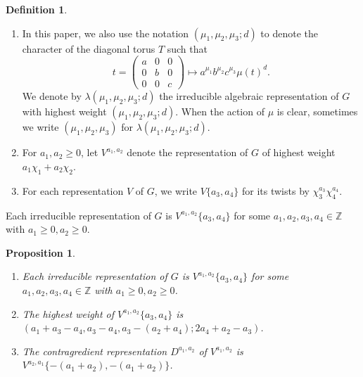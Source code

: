 \documentclass[11pt, a4paper]{amsart}
\theoremstyle{plain}
\newtheorem{proposition}[theorem]{Proposition}
\theoremstyle{definition}
\newtheorem{definition}[theorem]{Definition}
\numberwithin{equation}{section}
\begin{document}
\begin{definition}
\begin{enumerate}
\begin{align*}
\begin{pmatrix}
                                                                        0 & 0 & \frac{z\bar{z}}{\bar{x}}
                                                                  \end{pmatrix} \mapsto \frac{\overline{\det}}{\mu}.                                           
        \end{align*}
        Here, $x, \bar{x}, z, \bar{z}$ are $4$ independent variables. 
        \item In this paper, we also use the notation $(\mu_1, \mu_2, \mu_3; d)$ to denote the character of the diagonal torus $T$ such that 
              \begin{equation*}
                   t = \begin{pmatrix}
                         a & 0 & 0 \\
                         0 & b & 0 \\
                         0 & 0 & c 
                       \end{pmatrix} \mapsto a^{\mu_1} b^{\mu_2} c^{\mu_3} \mu(t)^{d}. 
              \end{equation*}
        We denote by $\lambda(\mu_1, \mu_2, \mu_3; d)$ the irreducible algebraic representation of $G$ with highest weight $(\mu_1, \mu_2, \mu_3; d)$. When the action of $\mu$ is clear, sometimes we write $(\mu_1, \mu_2, \mu_3)$ for $\lambda(\mu_1, \mu_2, \mu_3; d)$. 
        \item For $a_1, a_2 \ge 0$, let $V^{a_1, a_2}$ denote the representation of $G$ of highest weight $a_1\chi_1 + a_2\chi_2$.
        \item For each representation $V$ of $G$, we write $V\{a_3,a_4\}$ for its twists by $\chi_3^{a_3}\chi_4^{a_4}$.
    \end{enumerate}
\end{definition}
Each irreducible representation of $G$ is $V^{a_1,a_2}\{a_3,a_4\}$ for some $a_1, a_2, a_3, a_4 \in \mathbb{Z}$ with $a_1 \ge 0, a_2 \ge 0$. 

\begin{proposition}
    \begin{enumerate}
        \item Each irreducible representation of $G$ is $V^{a_1,a_2}\{a_3,a_4\}$ for some $a_1, a_2, a_3, a_4 \in \mathbb{Z}$ with $a_1 \ge 0, a_2 \ge 0$.
        \item The highest weight of $V^{a_1,a_2}\{a_3,a_4\}$ is $(a_1 + a_3 - a_4, a_3 - a_4, a_3 - (a_2 + a_4); 2a_4 + a_2 - a_3)$. 
        \item The contragredient representation $D^{a_1, a_2}$ of $V^{a_1, a_2}$ is $V^{a_2, a_1}\{-(a_1 + a_2), -(a_1 + a_2) \}$. 
    \end{enumerate}
\end{proposition}
\end{document}
